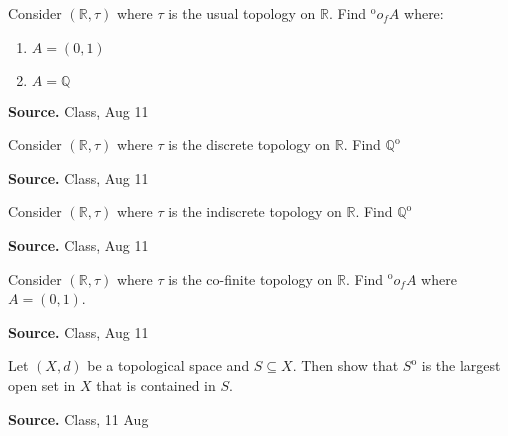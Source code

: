 \documentclass[12pt,twoside]{report}
\newenvironment*{source}{\hfill\scriptsize\textbf{Source.}\space}{\par}
\begin{document}
\begin{samepage}
\begin{ex}
Consider $\left (\mathbb{R}, \tau\right )$ where $\tau$ is the usual topology on $\mathbb{R}$.
Find $^\mathrm{o} o_f A$ where:
    \begin{enumerate}
        \item $A = \left (0,1\right )$
        \item $A = \mathbb{Q}$
    \end{enumerate}
\end{ex}
\begin{source}
Class, Aug 11
\end{source}
\end{samepage}

\begin{samepage}
\begin{ex}
Consider $\left (\mathbb{R}, \tau\right )$ where $\tau$ is the discrete topology on $\mathbb{R}$.
Find $\mathbb{Q} ^\mathrm{o}$
\end{ex}
\begin{source}
Class, Aug 11
\end{source}
\end{samepage}

\begin{samepage}
\begin{ex}
Consider $\left (\mathbb{R}, \tau\right )$ where $\tau$ is the indiscrete topology on $\mathbb{R}$.
Find $\mathbb{Q} ^\mathrm{o}$
\end{ex}
\begin{source}
Class, Aug 11
\end{source}
\end{samepage}

\begin{samepage}
\begin{ex}
Consider $\left (\mathbb{R}, \tau\right )$ where $\tau$ is the co-finite topology on $\mathbb{R}$.
Find $^\mathrm{o} o_f A$ where $A = \left (0,1\right )$.
\end{ex}
\begin{source}
Class, Aug 11
\end{source}
\end{samepage}

\begin{samepage}
\begin{ex}
Let $\left (X,d\right )$ be a topological space and $S \subseteq X$. Then show that $S ^\mathrm{o}$ is the largest open set in $X$ that is contained in $S$.
\end{ex}
\begin{source}
Class, 11 Aug
\end{source}
\end{samepage}
\end{document}

